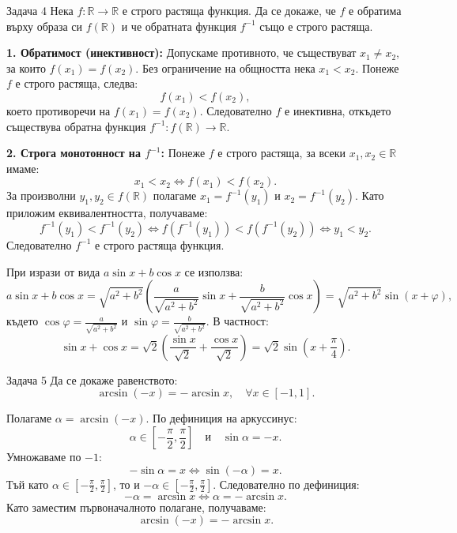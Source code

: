 \vspace{1em}

\begin{problembox}{Задача 4}
Нека $f: \mathbb{R} \to \mathbb{R}$ е строго растяща функция.
Да се докаже, че $f$ е обратима върху образа си $f(\mathbb{R})$ и че обратната функция $f^{-1}$ също е строго растяща.
\end{problembox}

\begin{solution}
\textbf{1. Обратимост (инективност):}
Допускаме противното, че съществуват $x_1 \neq x_2$, за които $f(x_1) = f(x_2)$.
Без ограничение на общността нека $x_1 < x_2$. Понеже $f$ е строго растяща, следва:
\[
f(x_1) < f(x_2),
\]
което противоречи на $f(x_1) = f(x_2)$.
Следователно $f$ е инективна, откъдето съществува обратна функция $f^{-1}: f(\mathbb{R}) \to \mathbb{R}$.

\textbf{2. Строга монотонност на $f^{-1}$:}
Понеже $f$ е строго растяща, за всеки $x_1, x_2 \in \mathbb{R}$ имаме:
\[
x_1 < x_2 \iff f(x_1) < f(x_2).
\]
За произволни $y_1, y_2 \in f(\mathbb{R})$ полагаме $x_1 = f^{-1}(y_1)$ и $x_2 = f^{-1}(y_2)$. Като приложим еквивалентността, получаваме:
\[
f^{-1}(y_1) < f^{-1}(y_2) \iff f(f^{-1}(y_1)) < f(f^{-1}(y_2)) \iff y_1 < y_2.
\]
Следователно $f^{-1}$ е строго растяща функция.
\end{solution}

\vspace{1em}

\vspace{1em}

При изрази от вида $a\sin x + b\cos x$ се използва:
\[
a\sin x + b\cos x = \sqrt{a^2 + b^2}\left(\frac{a}{\sqrt{a^2 + b^2}}\sin x + \frac{b}{\sqrt{a^2 + b^2}}\cos x\right) = \sqrt{a^2 + b^2}\sin(x + \varphi),
\]
където $\cos\varphi = \frac{a}{\sqrt{a^2 + b^2}}$ и $\sin\varphi = \frac{b}{\sqrt{a^2 + b^2}}$.
В частност:
\[
\sin x + \cos x = \sqrt{2}\left(\frac{\sin x}{\sqrt{2}} + \frac{\cos x}{\sqrt{2}}\right) = \sqrt{2}\sin\left(x + \frac{\pi}{4}\right).
\]

\vspace{1em}

\begin{problembox}{Задача 5}
Да се докаже равенството:
\[
\arcsin(-x) = -\arcsin x, \quad \forall x \in [-1, 1].
\]
\end{problembox}

\begin{solution}
Полагаме $\alpha = \arcsin(-x)$. По дефиниция на аркуссинус:
\[
\alpha \in \left[-\frac{\pi}{2}, \frac{\pi}{2}\right] \quad \text{и} \quad \sin \alpha = -x.
\]
Умножаваме по $-1$:
\[
-\sin \alpha = x \iff \sin(-\alpha) = x.
\]
Тъй като $\alpha \in \left[-\frac{\pi}{2}, \frac{\pi}{2}\right]$, то и $-\alpha \in \left[-\frac{\pi}{2}, \frac{\pi}{2}\right]$. Следователно по дефиниция:
\[
-\alpha = \arcsin x \iff \alpha = -\arcsin x.
\]
Като заместим първоначалното полагане, получаваме:
\[
\arcsin(-x) = -\arcsin x.
\]
\end{solution}

